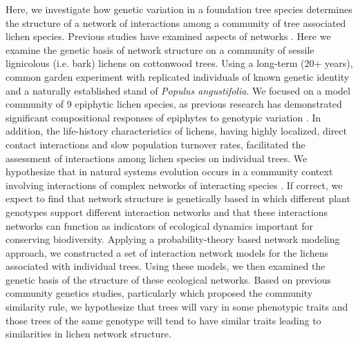 \documentclass[11pt,twocolumn,twoside,lineno]{pnas-new}
\begin{document}
Here, we investigate how genetic variation in a foundation tree
species determines the structure of a network of interactions among a
community of tree associated lichen species. Previous studies have
examined aspects of networks \citep{Barbour2019TraitCommunities}. Here
we examine the genetic basis of network structure on a community of
sessile lignicolous (i.e. bark) lichens on cottonwood trees. Using a
long-term (20+ years), common garden experiment with replicated
individuals of known genetic identity and a naturally established
stand of \textit{Populus angustifolia}. We focused on a model
community of 9 epiphytic lichen species, as previous research has
demonstrated significant compositional responses of epiphytes to
genotypic variation \citep{Winfree2011, Zytynska2011}. In addition,
the life-history characteristics of lichens, having highly localized,
direct contact interactions and slow population turnover rates,
facilitated the assessment of interactions among lichen species on
individual trees. We hypothesize that in natural systems evolution
occurs in a community context involving interactions of complex
networks of interacting species \cite{Lau2015a, Keith2017,
  Thompson2013, Bascompte2006}.  If correct, we expect to find that
network structure is genetically based in which different plant
genotypes support different interaction networks and that these
interactions networks can function as indicators of ecological
dynamics important for conserving biodiversity.  Applying a
probability-theory based network modeling approach, we constructed a
set of interaction network models for the lichens associated with
individual trees. Using these models, we then examined the genetic
basis of the structure of these ecological networks. Based on previous
community genetics studies, particularly \citep{Bangert2006} which
proposed the community similarity rule, we hypothesize that trees will
vary in some phenotypic traits and those trees of the same genotype
will tend to have similar traits leading to similarities in lichen
network structure.
\end{document}
